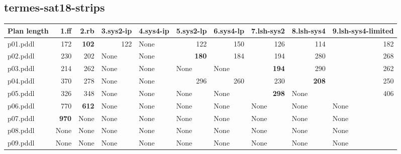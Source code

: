 \documentclass{article}
\begin{document}
\hypertarget{plan_length-termes-sat18-strips}{}
\subsection*{termes-sat18-strips}

\begin{tabular}{@{}lrrrrrrrrr@{}}
Plan length & 1.ff & 2.rb & 3.sys2-ip & 4.sys4-ip & 5.sys2-lp & 6.sys4-lp & 7.lsh-sys2 & 8.lsh-sys4 & 9.lsh-sys4-limited \\
\midrule
p01.pddl & 172 & \textbf{102} & 122 & \multicolumn{1}{|l|}{None} & 122 & 150 & 126 & 114 & 182 \\
p02.pddl & 230 & 202 & \multicolumn{1}{|l|}{None} & \multicolumn{1}{|l|}{None} & \textbf{180} & 184 & 194 & 280 & 268 \\
p03.pddl & 214 & 262 & \multicolumn{1}{|l|}{None} & \multicolumn{1}{|l|}{None} & \multicolumn{1}{|l|}{None} & \multicolumn{1}{|l|}{None} & \textbf{194} & 290 & 262 \\
p04.pddl & 370 & 278 & \multicolumn{1}{|l|}{None} & \multicolumn{1}{|l|}{None} & 296 & 260 & 230 & \textbf{208} & 250 \\
p05.pddl & 326 & 348 & \multicolumn{1}{|l|}{None} & \multicolumn{1}{|l|}{None} & \multicolumn{1}{|l|}{None} & \multicolumn{1}{|l|}{None} & \textbf{298} & \multicolumn{1}{|l|}{None} & 406 \\
p06.pddl & 770 & \textbf{612} & \multicolumn{1}{|l|}{None} & \multicolumn{1}{|l|}{None} & \multicolumn{1}{|l|}{None} & \multicolumn{1}{|l|}{None} & \multicolumn{1}{|l|}{None} & \multicolumn{1}{|l|}{None} & \multicolumn{1}{|l|}{None} \\
p07.pddl & \textbf{970} & \multicolumn{1}{|l|}{None} & \multicolumn{1}{|l|}{None} & \multicolumn{1}{|l|}{None} & \multicolumn{1}{|l|}{None} & \multicolumn{1}{|l|}{None} & \multicolumn{1}{|l|}{None} & \multicolumn{1}{|l|}{None} & \multicolumn{1}{|l|}{None} \\
p08.pddl & \multicolumn{1}{|l|}{None} & \multicolumn{1}{|l|}{None} & \multicolumn{1}{|l|}{None} & \multicolumn{1}{|l|}{None} & \multicolumn{1}{|l|}{None} & \multicolumn{1}{|l|}{None} & \multicolumn{1}{|l|}{None} & \multicolumn{1}{|l|}{None} & \multicolumn{1}{|l|}{None} \\
p09.pddl & \multicolumn{1}{|l|}{None} & \multicolumn{1}{|l|}{None} & \multicolumn{1}{|l|}{None} & \multicolumn{1}{|l|}{None} & \multicolumn{1}{|l|}{None} & \multicolumn{1}{|l|}{None} & \multicolumn{1}{|l|}{None} & \multicolumn{1}{|l|}{None} & \multicolumn{1}{|l|}{None} \\

\end{tabular}
\end{document}
